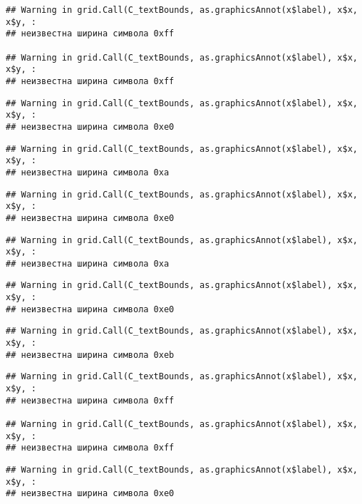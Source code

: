 \documentclass[
]{article}
\begin{document}
\begin{verbatim}
## Warning in grid.Call(C_textBounds, as.graphicsAnnot(x$label), x$x, x$y, :
## неизвестна ширина символа 0xff

## Warning in grid.Call(C_textBounds, as.graphicsAnnot(x$label), x$x, x$y, :
## неизвестна ширина символа 0xff
\end{verbatim}

\begin{verbatim}
## Warning in grid.Call(C_textBounds, as.graphicsAnnot(x$label), x$x, x$y, :
## неизвестна ширина символа 0xe0
\end{verbatim}

\begin{verbatim}
## Warning in grid.Call(C_textBounds, as.graphicsAnnot(x$label), x$x, x$y, :
## неизвестна ширина символа 0xa
\end{verbatim}

\begin{verbatim}
## Warning in grid.Call(C_textBounds, as.graphicsAnnot(x$label), x$x, x$y, :
## неизвестна ширина символа 0xe0
\end{verbatim}

\begin{verbatim}
## Warning in grid.Call(C_textBounds, as.graphicsAnnot(x$label), x$x, x$y, :
## неизвестна ширина символа 0xa
\end{verbatim}

\begin{verbatim}
## Warning in grid.Call(C_textBounds, as.graphicsAnnot(x$label), x$x, x$y, :
## неизвестна ширина символа 0xe0
\end{verbatim}

\begin{verbatim}
## Warning in grid.Call(C_textBounds, as.graphicsAnnot(x$label), x$x, x$y, :
## неизвестна ширина символа 0xeb
\end{verbatim}

\begin{verbatim}
## Warning in grid.Call(C_textBounds, as.graphicsAnnot(x$label), x$x, x$y, :
## неизвестна ширина символа 0xff

## Warning in grid.Call(C_textBounds, as.graphicsAnnot(x$label), x$x, x$y, :
## неизвестна ширина символа 0xff
\end{verbatim}

\begin{verbatim}
## Warning in grid.Call(C_textBounds, as.graphicsAnnot(x$label), x$x, x$y, :
## неизвестна ширина символа 0xe0
\end{verbatim}
\end{document}

